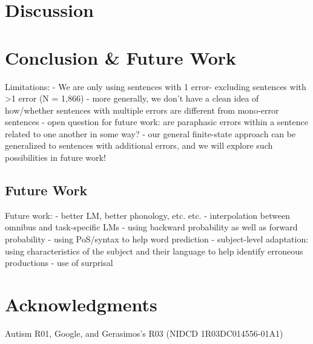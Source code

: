 \documentclass[11pt,letterpaper]{article}
\begin{document}
\section{Discussion}

\section{Conclusion \& Future Work}

Limitations:
    - We are only using sentences with 1 error- excluding sentences with >1 error (N = 1,866)
    - more generally, we don't have a clean idea of how/whether sentences with multiple errors are different from mono-error sentences
        - open question for future work: are paraphasic errors within a sentence related to one another in some way?
        - our general finite-state approach can be generalized to sentences with additional errors, and we will explore such possibilities in future work!

\subsection{Future Work} %
\label{sub:future_work}

Future work:
    - better LM, better phonology, etc. etc.
        - interpolation between omnibus and task-specific LMs
        - using backward probability as well as forward probability
    - using PoS/syntax to help word prediction
    - subject-level adaptation: using characteristics of the subject and their language to help identify erroneous productions
    - use of surprisal



\section*{Acknowledgments}

Autism R01, Google, and Gerasimos's R03 (NIDCD 1R03DC014556-01A1)




\end{document}

